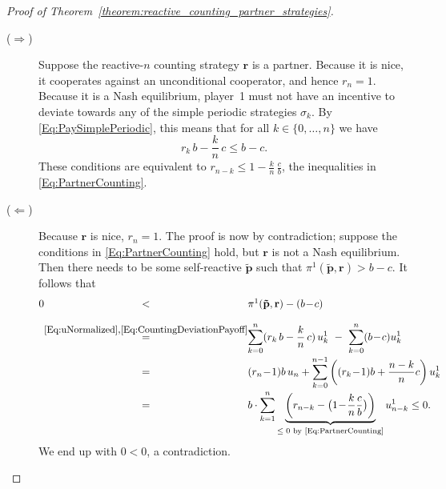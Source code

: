 \documentclass[9pt,twoside,lineno]{pnas-new}
\theoremstyle{plainCl1}
\theoremstyle{plainCl2}
\begin{document}
\begin{proof}[Proof of Theorem~\ref{theorem:reactive_counting_partner_strategies}] ~
\begin{description}
\item[\normalfont ($\Rightarrow$)]
Suppose the reactive-$n$ counting strategy $\mathbf{r}$ is a partner.
Because it is nice, it cooperates against an unconditional cooperator, and hence $r_n\!=\!1$. 
Because it is a Nash equilibrium, player~1 must not have an incentive to deviate towards any of the simple periodic strategies $\sigma_k$. By \eqref{Eq:PaySimplePeriodic}, this means that for all $k\!\in\!\{0,\ldots,n\}$ we have
\begin{equation}
 r_k\,b - \frac{k}{n}\,c \le b\!-\!c.
\end{equation}
These conditions are equivalent to $r_{n-k} \le 1\!-\!\frac{k}{n}\,\frac{c}{b}$, the inequalities in \eqref{Eq:PartnerCounting}.

\item[\normalfont ($\Leftarrow$)] Because $\mathbf{r}$ is nice, $r_n\!=\!1$. The proof is now by contradiction; suppose the conditions  in \eqref{Eq:PartnerCounting} hold, but $\mathbf{r}$ is not a Nash equilibrium. 
Then there needs to be some self-reactive  $\mathbf{\tilde p}$ such that $\pi^1(\mathbf{\tilde p},\mathbf{r}) > b\!-\!c$. It follows that
\begin{equation} \label{Eq:AkinPartnerArgument}
\setlength{\arraycolsep}{0mm}
\begin{array}{rcl}
0	&<	
	&\pi^1(\mathbf{\tilde p},\mathbf{r}) - (b\!-\!c)\\[0.4cm]
	
	&\stackrel{\mbox{\small \eqref{Eq:uNormalized},\eqref{Eq:CountingDeviationPayoff}}}{=}  
	&\displaystyle \sum_{k=0}^n  (r_k\,b - \frac{k}{n}\,c) \,u^1_k ~-~ \sum_{k=0}^n (b\!-\!c)u^1_k\\[0.4cm]
	
	&=
	&\displaystyle (r_n\!-\!1)b\, u_n + \sum_{k=0}^{n-1} \left((r_k\!-\!1)b + \frac{n-k}{n}c\right)u^1_k\\[0.4cm]
	
	&=
	& \displaystyle b\cdot \sum_{k=1}^{n}  \underbrace{\left( r_{n-k}-\big(1\!-\! \frac{k}{n}\frac{c}{b}\big)\right)}_\text{$\le 0$ by \eqref{Eq:PartnerCounting}} u^1_{n-k} \le 0. 
\end{array}
\end{equation}
We end up with $0\!<\!0$, a contradiction.
\end{description}
\end{proof}
\end{document}
